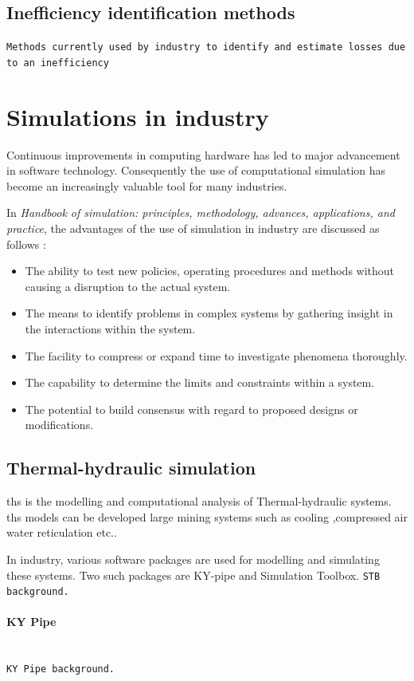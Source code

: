 	\subsection{Inefficiency identification methods}
	\texttt{Methods currently used by industry to identify and estimate losses due to an inefficiency}
	
	
\section{Simulations in industry}

Continuous improvements in computing hardware has led to major advancement in software technology. Consequently the use of computational simulation has become an increasingly valuable tool for many industries.\cite{kocsis2003integration} \par 

 In \textit{ Handbook of simulation: principles, methodology, advances, applications, and practice}, the advantages of the use of simulation in industry are discussed as follows \cite{banks1998handbook}: 
\begin{itemize}
	\item The ability to test new policies, operating procedures and methods without causing a disruption to the actual system.
	\item The means to identify problems in complex systems by gathering insight in the interactions within the system.
	\item The facility to compress or expand time to investigate phenomena thoroughly.
	\item The capability to determine the limits and constraints within a system.
	\item The potential to build consensus with regard to proposed designs or modifications.
\end{itemize}

\subsection{Thermal-hydraulic simulation}
\gls{ths} is the modelling and computational analysis of Thermal-hydraulic systems. \gls{ths} models can be developed large mining systems such as cooling ,compressed air water reticulation etc..\par
In industry, various software packages are used for modelling and simulating these systems. Two such packages are KY-pipe and Simulation Toolbox.
\texttt{STB background.}
\paragraph{KY Pipe}\leavevmode\\
\texttt{KY Pipe background.}
